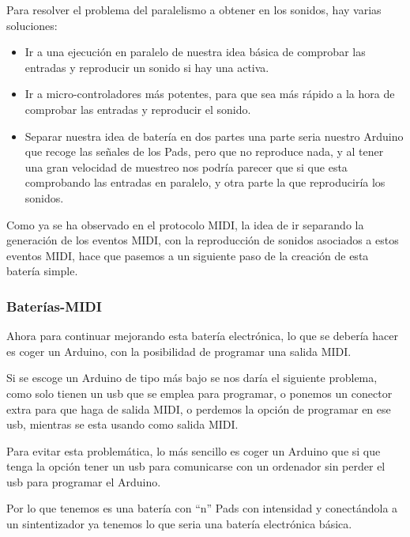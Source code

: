 \documentclass[a4paper,11pt,oneside]{book}
\begin{document}
Para resolver el problema del paralelismo a obtener en los sonidos, hay varias soluciones:
\begin{itemize}
  \item Ir a una ejecución en paralelo de nuestra idea básica de comprobar las entradas y reproducir un sonido si hay una activa.
  \item Ir a micro-controladores más potentes, para que sea más rápido a la hora de comprobar las entradas y reproducir el sonido.
  \item Separar nuestra idea de batería en dos partes una parte seria nuestro Arduino que recoge las señales de los \gls{Pads}, pero que no reproduce nada, y al tener una gran velocidad de muestreo nos podría parecer que si que esta comprobando las entradas en paralelo, y otra parte la que reproduciría los sonidos.
\end{itemize}

Como ya se ha observado en el protocolo MIDI, la idea de ir separando la generación de los eventos MIDI, con la reproducción de sonidos asociados a estos eventos MIDI, hace que pasemos a un siguiente paso de la creación de esta batería simple.


\subsubsection{Baterías-MIDI}

Ahora para continuar mejorando esta batería electrónica, lo que se debería hacer es coger un Arduino, con la posibilidad de programar una salida MIDI. 

Si se escoge un Arduino de tipo más bajo se nos daría el siguiente problema, como solo tienen un usb que se emplea para programar, o ponemos un conector extra para que haga de salida MIDI, o perdemos la opción de programar en ese usb, mientras se esta usando como salida MIDI.

Para evitar esta problemática, lo más sencillo es coger un Arduino que si que tenga la opción tener un usb para comunicarse con un ordenador sin perder el usb para programar el Arduino.

Por lo que tenemos es una batería con ``n'' \gls{Pads} con intensidad y conectándola a un sintentizador ya tenemos lo que seria una batería electrónica básica.
\end{document}
